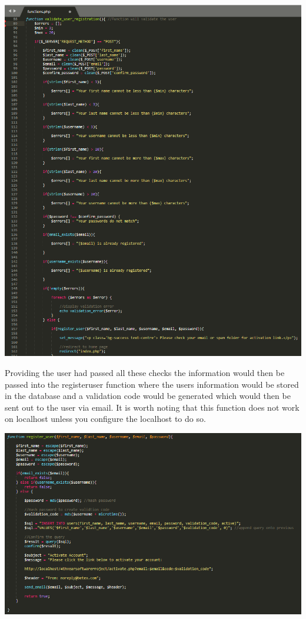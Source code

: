 \includegraphics[width=\textwidth,height=\textheight,keepaspectratio]{img/validationRegister.png}

Providing the user had passed all these checks the information would then be passed into the registeruser function where the users information would be stored in the database and a validation code would be generated which would then be sent out to the user via email. It is worth noting that this function does not work on localhost unless you configure the localhost to do so.

\includegraphics[width=\textwidth,height=\textheight,keepaspectratio]{img/register.png}

